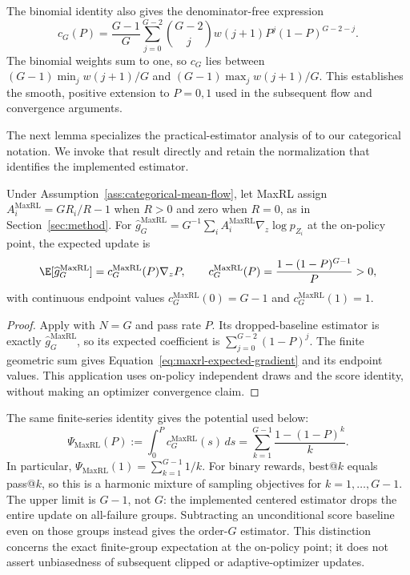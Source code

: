 The binomial identity also gives the denominator-free expression
\[
 c_G(P)=\frac{G-1}{G}\sum_{j=0}^{G-2}\binom{G-2}{j}
 w(j+1)P^j(1-P)^{G-2-j}.
\]
The binomial weights sum to one, so $c_G$ lies between
$(G-1)\min_j w(j+1)/G$ and $(G-1)\max_j w(j+1)/G$.
This establishes the smooth, positive extension to $P=0,1$ used in the
subsequent flow and convergence arguments.

The next lemma specializes the practical-estimator analysis of
\citet[Section~4.3 and App.~D, Theorem~5]{tajwar2026maxrl}
to our categorical notation. We invoke that result directly and retain the
normalization that identifies the implemented estimator.

\begin{lemma}
\enforcehalffinalproseline
\label{lem:maxrl-mean}
Under Assumption~\ref{ass:categorical-mean-flow}, let MaxRL assign
$A_i^{\mathrm{MaxRL}}=GR_i/R-1$ when $R>0$ and zero when $R=0$, as in
Section~\ref{sec:method}. For
$\widehat g_G^{\mathrm{MaxRL}}=G^{-1}\sum_i
 A_i^{\mathrm{MaxRL}}\nabla_z\log p_{Z_i}$ at the on-policy point, the
expected update is
\begin{equation}
  \E[\widehat g_G^{\mathrm{MaxRL}}]
  =c_G^{\mathrm{MaxRL}}(P)\nabla_zP,
  \qquad
  c_G^{\mathrm{MaxRL}}(P)
  =\frac{1-(1-P)^{G-1}}{P}>0,
  \label{eq:maxrl-expected-gradient}
\end{equation}
with continuous endpoint values
$c_G^{\mathrm{MaxRL}}(0)=G-1$ and
$c_G^{\mathrm{MaxRL}}(1)=1$.
\end{lemma}

\begin{proof}
\enforcehalffinalproseline
Apply \citet[Theorem~5]{tajwar2026maxrl} with $N=G$ and pass rate $P$.
Its dropped-baseline estimator is exactly $\widehat g_G^{\mathrm{MaxRL}}$,
so its expected coefficient is $\sum_{j=0}^{G-2}(1-P)^j$.
The finite geometric sum gives Equation~\eqref{eq:maxrl-expected-gradient}
and its endpoint values. This application uses on-policy independent draws
and the score identity, without making an optimizer convergence claim.
\end{proof}

The same finite-series identity gives the potential used below:
\begin{equation}
 \Psi_{\mathrm{MaxRL}}(P)
 :=\int_0^P c_G^{\mathrm{MaxRL}}(s)\,ds
 =\sum_{k=1}^{G-1}\frac{1-(1-P)^k}{k}.
 \label{eq:maxrl-potential-finite-sum}
\end{equation}
In particular, $\Psi_{\mathrm{MaxRL}}(1)=\sum_{k=1}^{G-1}1/k$.
For binary rewards, best@\(k\) equals pass@\(k\), so this is a harmonic
mixture of sampling objectives for $k=1,\ldots,G-1$. The upper limit is
$G-1$, not $G$: the implemented centered estimator drops the entire update
on all-failure groups. Subtracting an unconditional score baseline even on
those groups instead gives the order-$G$ estimator. This distinction concerns
the exact finite-group expectation at the on-policy point; it does not assert
unbiasedness of subsequent clipped or adaptive-optimizer updates.


